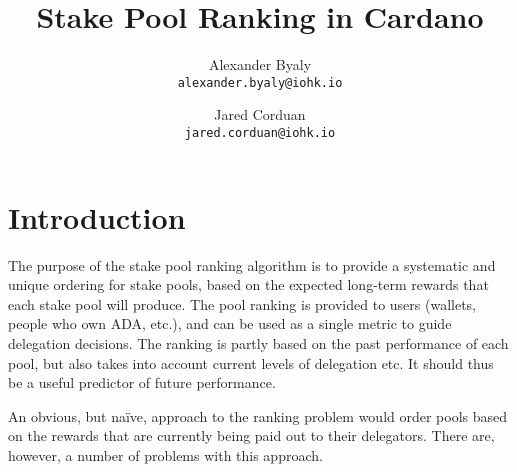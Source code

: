 \documentclass[11pt,a4paper,dvipsnames,twosided]{article}
\begin{document}
\title{Stake Pool Ranking in Cardano}

\author{Alexander Byaly  \\ {\small \texttt{alexander.byaly@iohk.io}} \\
   \and Jared Corduan  \\ {\small \texttt{jared.corduan@iohk.io}}}



\setlength{\parindent}{0pt}
\setlength{\parskip}{12pt plus 3pt minus 2pt}

\maketitle

\section{Introduction}

The purpose of the stake pool ranking algorithm is to provide a systematic and unique ordering for stake pools,
based on the expected long-term rewards that each stake pool will produce.
The pool ranking is provided to users (wallets, people who own ADA, etc.), and can be used as a single
metric to guide delegation decisions.  The ranking is partly based on the past performance of each pool, but
also takes into account current levels of delegation etc.  It should thus be a useful predictor of future performance.


An obvious, but na\"{i}ve, approach to the ranking problem would order pools based on the rewards that are
currently being paid out to their delegators.  There are, however, a number of problems with this approach.
\end{document}
